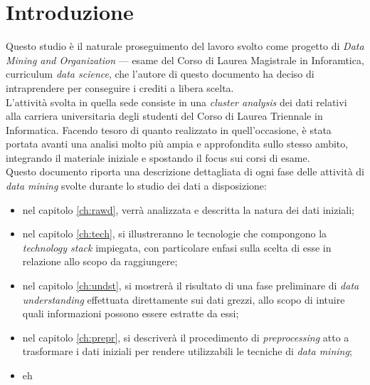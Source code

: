 \chapter{Introduzione}
\label{ch:intro}

Questo studio è il naturale proseguimento del lavoro svolto come progetto di \textit{Data Mining and Organization} --- esame del Corso di Laurea Magistrale in Inforamtica, curriculum \textit{data science}, che l'autore di questo documento ha deciso di intraprendere per conseguire i crediti a libera scelta. \\

L'attività svolta in quella sede consiste in una \textit{cluster analysis} dei dati relativi alla carriera universitaria degli studenti del Corso di Laurea Triennale in Informatica. Facendo tesoro di quanto realizzato in quell'occasione, è stata portata avanti una analisi molto più ampia e approfondita sullo stesso ambito, integrando il materiale iniziale e spostando il focus sui corsi di esame. \\

Questo documento riporta una descrizione dettagliata di ogni fase delle attività di \textit{data mining} svolte durante lo studio dei dati a disposizione:

\begin{itemize}
    \item nel capitolo \ref{ch:rawd}, verrà analizzata e descritta la natura dei dati iniziali;
    \item nel capitolo \ref{ch:tech}, si illustreranno le tecnologie che compongono la \textit{technology stack} impiegata, con particolare enfasi sulla scelta di esse in relazione allo scopo da raggiungere;
    \item nel capitolo \ref{ch:undst}, si mostrerà il risultato di una fase preliminare di \textit{data understanding} effettuata direttamente sui dati grezzi, allo scopo di intuire quali informazioni possono essere estratte da essi;
    \item nel capitolo \ref{ch:prepr}, si descriverà il procedimento di \textit{preprocessing} atto a trasformare i dati iniziali per rendere utilizzabili le tecniche di \textit{data mining};
    \item  eh
\end{itemize}

